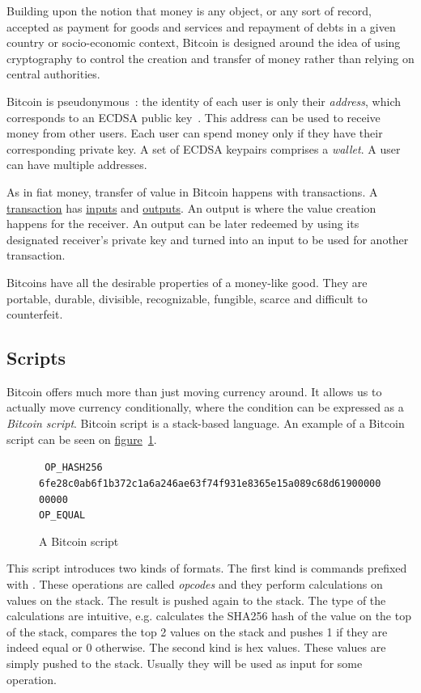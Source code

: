 Building upon the notion that money is any object, or any sort of record, accepted as payment for goods and services and repayment of debts in a given country or socio-economic context, Bitcoin is designed around the idea of using cryptography to control the creation and transfer of money rather than relying on central authorities.

Bitcoin is pseudonymous~\cite{gtklocker}: the identity of each user is only their \emph{address}, which corresponds to an ECDSA public key~\cite{ecdsa}. This address can be used to receive money from other users. Each user can spend money only if they have their corresponding private key. A set of ECDSA keypairs comprises a \emph{wallet}. A user can have multiple addresses.

As in fiat money, transfer of value in Bitcoin happens with transactions. A \hyperref[sec:transactions]{transaction} has \hyperref[sec:inputs]{inputs} and \hyperref[sec:outputs]{outputs}. An output is where the value creation happens for the receiver. An output can be later redeemed by using its designated receiver's private key and turned into an input to be used for another transaction.

Bitcoins have all the desirable properties of a money-like good. They are portable, durable, divisible, recognizable, fungible, scarce and difficult to counterfeit.

\subsection{Scripts}
Bitcoin offers much more than just moving currency around. It allows us to actually move currency conditionally, where the condition can be expressed as a \emph{Bitcoin script}. Bitcoin script is a stack-based language. An example of a Bitcoin script can be seen on \hyperref[fig:bitcoin-script]{figure}~\ref{fig:bitcoin-script}.

\begin{figure}[hb]
  \centering
  {
    \tt
    OP\_HASH256 \\
    6fe28c0ab6f1b372c1a6a246ae63f74f931e8365e15a089c68d6190000000000 \\
    OP\_EQUAL
  }
  \caption{A Bitcoin script~\cite{gtklocker}}
  \label{fig:bitcoin-script}
\end{figure}

This script introduces two kinds of formats. The first kind is commands prefixed with . These operations are called \emph{opcodes} and they perform calculations on values on the stack. The result is pushed again to the stack. The type of the calculations are intuitive, e.g.  calculates the SHA256 hash of the value on the top of the stack,  compares the top 2 values on the stack and pushes 1 if they are indeed equal or 0 otherwise. The second kind is hex values. These values are simply pushed to the stack. Usually they will be used as input for some operation.

